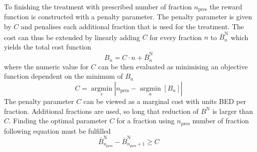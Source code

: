 \documentclass[\relativeRoot/ada.tex]{subfiles}
\begin{document}
To finishing the treatment with prescribed number of fraction $n_{\text{pres}}$ the reward function is constructed with a penalty parameter. The penalty parameter is given by $C$ and penalises each additional fraction  that is used for the treatment. The cost can thus be extended by linearly adding $C$ for every fraction $n$ to $\bar{B}^{\text{N}}_n$ which yields the total cost function
\begin{equation*}
    B_n = C \cdot n + \bar{B}^{\text{N}}_n
\end{equation*}
where the numeric value for $C$ can be then evaluated as minimising an objective function dependent on the minimum of $B_n$
\begin{equation*}
    C = \underset{c}{\operatorname{argmin}}\left| n_{\text{pres}} - \underset{n}{\operatorname{argmin}} \left[B_n \right] \right|
\end{equation*}
The penalty parameter $C$ can be viewed as a marginal cost with units BED per fraction. Additional fractions are used, so long that reduction of $B^{\text{N}}$ is larger than $C$. Finding the optimal parameter $C$ for a fraction using $n_{\text{pres}}$ number of fraction following equation must be fulfilled
\begin{equation*}
    \bar{B}^{\text{N}}_{n_{\text{pres}}} - \bar{B}^{\text{N}}_{n_{\text{pres}}+1} \geq C
\end{equation*}
\end{document}
